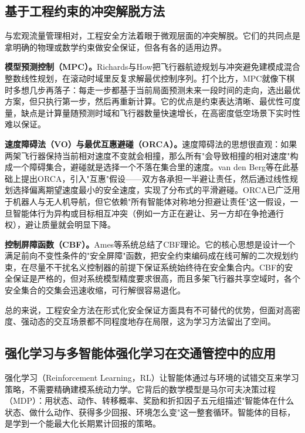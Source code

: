 \documentclass[12pt,a4paper,UTF8]{ctexart}
\begin{document}
\subsection{基于工程约束的冲突解脱方法}

与宏观流量管理相对，工程安全方法着眼于微观层面的冲突解脱。它们的共同点是拿明确的物理或数学约束做安全保证，但各有各的适用边界。

\textbf{模型预测控制（MPC）。}Richards与How\cite{ref3}把飞行器航迹规划与冲突避免建模成混合整数线性规划，在滚动时域里反复求解最优控制序列。打个比方，MPC就像下棋时多想几步再落子：每走一步都基于当前局面预测未来一段时间的走向，选出最优方案，但只执行第一步，然后再重新计算。它的优点是约束表达清晰、最优性可度量，缺点是计算量随预测时域和飞行器数量快速增长，在高密度低空场景下实时性难以保证。

\textbf{速度障碍法（VO）与最优互惠避碰（ORCA）。}速度障碍法的思想很直观：如果两架飞行器保持当前相对速度不变就会相撞，那么所有"会导致相撞的相对速度"构成一个障碍集合，避碰就是选择一个不落在集合里的速度。van den Berg等\cite{ref4}在此基础上提出ORCA，引入"互惠"假设——双方各承担一半避让责任，然后通过线性规划选择偏离期望速度最小的安全速度，实现了分布式的平滑避碰。ORCA已广泛用于机器人与无人机导航，但它依赖"所有智能体对称地分担避让责任"这一假设，一旦智能体行为异构或目标相互冲突（例如一方正在避让、另一方却在争抢通行权），避让质量就会明显下降。

\textbf{控制屏障函数（CBF）。}Ames等\cite{ref5}系统总结了CBF理论。它的核心思想是设计一个满足前向不变性条件的"安全屏障"函数，把安全约束编码成在线可解的二次规划约束，在尽量不干扰名义控制器的前提下保证系统始终待在安全集合内。CBF的安全保证是严格的，但对系统模型精度要求很高，而且多架飞行器共享空域时，各个安全集合的交集会迅速收缩，可行解很容易退化。

总的来说，工程安全方法在形式化安全保证方面具有不可替代的优势，但面对高密度、强动态的交互场景都不同程度地存在局限，这为学习方法留出了空间。

\subsection{强化学习与多智能体强化学习在交通管控中的应用}

强化学习（Reinforcement Learning，RL）让智能体通过与环境的试错交互来学习策略，不需要精确建模系统动力学。它背后的数学模型是马尔可夫决策过程（MDP）：用状态、动作、转移概率、奖励和折扣因子五元组描述"智能体在什么状态、做什么动作、获得多少回报、环境怎么变"这一整套循环。智能体的目标，是学到一个能最大化长期累计回报的策略。
\end{document}
